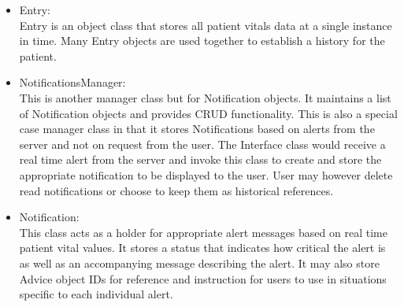 \begin{itemize}
  	\item Entry:\\
	Entry is an object class that stores all patient vitals data at a single instance in time. Many Entry objects are used together to establish a history for the patient. 
  	\item NotificationsManager:\\
	This is another manager class but for Notification objects. It maintains a list of Notification objects and provides CRUD functionality. This is also a special case manager class in that it stores Notifications based on alerts from the server and not on request from the user. The Interface class would receive a real time alert from the server and invoke this class to create and store the appropriate notification to be displayed to the user. User may however delete read notifications or choose to keep them as historical references. 
  	\item Notification:\\
	This class acts as a holder for appropriate alert messages based on real time patient vital values. It stores a status that indicates how critical the alert is as well as an accompanying message describing the alert. It may also store Advice object IDs for reference and instruction for users to use in situations specific to each individual alert.
\end{itemize}
